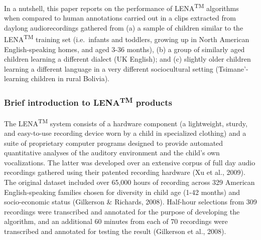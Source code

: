 \documentclass[english,table,man,floatsintext]{apa6}
\begin{document}
In a nutshell, this paper reports on the performance of LENA\textsuperscript{TM} algorithms when compared to human annotations carried out in a clips extracted from daylong audiorecordings gathered from (a) a sample of children similar to the LENA\textsuperscript{TM} training set (i.e.~infants and toddlers, growing up in North American English-speaking homes, and aged 3-36 months), (b) a group of similarly aged children learning a different dialect (UK English); and (c) slightly older children learning a different language in a very different sociocultural setting (Tsimane'-learning children in rural Bolivia).

\hypertarget{brief-introduction-to-lenatm-products}{%
\subsubsection{\texorpdfstring{Brief introduction to LENA\textsuperscript{TM} products}{Brief introduction to LENATM products}}\label{brief-introduction-to-lenatm-products}}

The LENA\textsuperscript{TM} system consists of a hardware component (a lightweight, sturdy, and easy-to-use recording device worn by a child in specialized clothing) and a suite of proprietary computer programs designed to provide automated quantitative analyses of the auditory environment and the child's own vocalizations. The latter was developed over an extensive corpus of full day audio recordings gathered using their patented recording hardware (Xu et al., 2009). The original dataset included over 65,000 hours of recording across 329 American English-speaking families chosen for diversity in child age (1-42 months) and socio-economic status (Gilkerson \& Richards, 2008). Half-hour selections from 309 recordings were transcribed and annotated for the purpose of developing the algorithm, and an additional 60 minutes from each of 70 recordings were transcribed and annotated for testing the result (Gilkerson et al., 2008).
\end{document}
